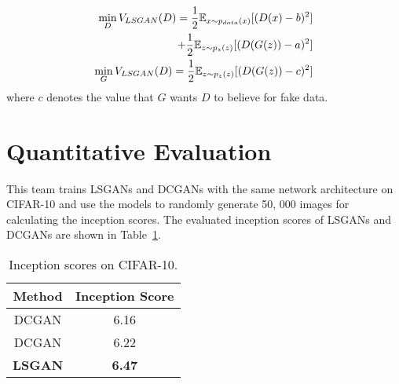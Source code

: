 \documentclass[10pt,twocolumn,letterpaper]{article}
\begin{document}
\begin{equation}\label{12}
\begin{split}
\mathop{{\rm min}}\limits_{D}V_{LSGAN}(D)=\frac{1}{2}\mathbb{E}_{x\sim p_{data}(x)}[(D(x)-b)^2] \\
+\frac{1}{2}\mathbb{E}_{z\sim p_z(z)}[(D(G(z))-a)^2] \\
\mathop{{\rm min}}\limits_{G}V_{LSGAN}(D)=\frac{1}{2}\mathbb{E}_{z\sim p_z(z)}[(D(G(z))-c)^2] \\
\end{split}
\end{equation}
where $c$ denotes the value that $G$ wants $D$ to believe for fake data.
\section{Quantitative Evaluation}
This team trains LSGANs and DCGANs with the same network architecture on CIFAR-10 and use the models to randomly generate 50, 000 images for calculating the inception scores. The evaluated inception scores of LSGANs and DCGANs are shown in Table~\ref{tab1}.
\begin{table}[htbp]
\small
\renewcommand\arraystretch{1.2}
\centering
\begin{tabular}{|c|c|}
\hline
Method & Inception Score \\
\hline
DCGAN & 6.16 \\
DCGAN & 6.22 \\
\textbf{LSGAN}  & \textbf{6.47} \\
\hline
\end{tabular} \\
\caption{Inception scores on CIFAR-10.} \label{tab1}
\end{table}
{\small


}
\end{document}
